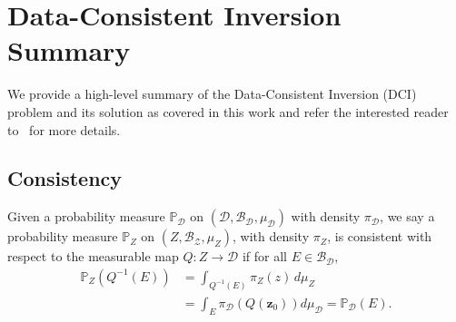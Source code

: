 \documentclass[final,1p,times]{elsarticle}
\begin{document}

\appendix



\section{Data-Consistent Inversion Summary}\label{app:DCI_summary}

We provide a high-level summary of the Data-Consistent Inversion (DCI) problem and its solution as covered in this work and refer the interested reader to~\cite{Butler2018} for more details.

\subsection{Consistency}\label{app:consistency}
Given a probability measure $\mathbb{P}_\mathcal{D}$ on $(\mathcal{D}, \mathcal{B}_\mathcal{D}, \mu_\mathcal{D})$ with density $\pi_\mathcal{D}$, we say a probability measure $\mathbb{P}_{Z}$ on $(Z, \mathcal{B}_{\mathcal{Z}}, \mu_Z)$, with density $\pi_Z$, is consistent with respect to the measurable map $Q:Z\to\mathcal{D}$ if for all $E\in\mathcal{B}_\mathcal{D}$, 
\begin{equation}
\begin{split}
    \mathbb{P}_Z(Q^{-1}(E)) 
    &= \int_{Q^{-1}(E)} \pi_Z(z) \, d\mu_Z \\
    &= \int_{E} \pi_{\mathcal{D}} \!\left(Q(\mathbf{z}_0)\right) d\mu_\mathcal{D} =\mathbb{P}_\mathcal{D}(E).   \label{eq:consistency}
\end{split}
\end{equation}
\end{document}
